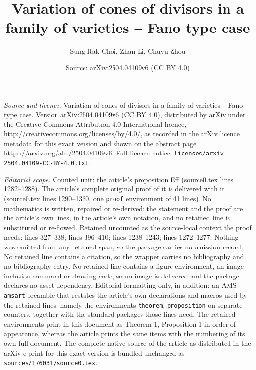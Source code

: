 \documentclass[10pt,a4paper]{amsart}
\title{Variation of cones of divisors in a family of varieties -- Fano type case}
\author{Sung Rak Choi, Zhan Li, Chuyu Zhou}
\date{Source: arXiv:2504.04109v6 (CC BY 4.0)}
\begin{document}
\maketitle

\noindent\emph{Source and licence.} Variation of cones of divisors in a family of varieties -- Fano type case. Version arXiv:2504.04109v6 (CC BY 4.0), distributed by arXiv under the Creative Commons Attribution 4.0 International licence, http://creativecommons.org/licenses/by/4.0/, as recorded in the arXiv licence metadata for this exact version and shown on the abstract page https://arxiv.org/abs/2504.04109v6. Full licence notice: \texttt{licenses/arxiv-2504.04109-CC-BY-4.0.txt}.\par\smallskip

\noindent\textit{Editorial scope.} Counted unit: the article's proposition Eff (source0.tex lines 1282--1288). The article's complete original proof of it is delivered with it (source0.tex lines 1290--1330, one \texttt{proof} environment of 41 lines). No mathematics is written, repaired or re-derived: the statement and the proof are the article's own lines, in the article's own notation, and no retained line is substituted or re-flowed.  Retained uncounted as the source-local context the proof needs: lines 327--338; lines 396--410; lines 1238--1243; lines 1272--1277.  Nothing was omitted from any retained span, so the package carries no omission record.  No retained line contains a citation, so the wrapper carries no bibliography and no bibliography entry.  No retained line contains a figure environment, an image-inclusion command or drawing code, so no image is delivered and the package declares no asset dependency.  Editorial formatting only, in addition: an AMS \texttt{amsart} preamble that restates the article's own declarations and macros used by the retained lines, namely the environments \texttt{theorem}, \texttt{proposition} on separate counters, together with the standard packages those lines need.  The retained environments print in this document as Theorem 1, Proposition 1 in order of appearance, whereas the article prints the same items with the numbering of its own full document.  The complete native source of the article as distributed in the arXiv e-print for this exact version is bundled unchanged as \texttt{sources/176031/source0.tex}.
\end{document}
